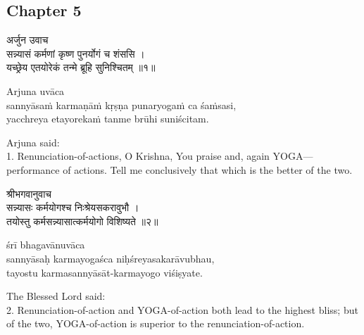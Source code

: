 \chapterdrop

\begin{center}

\headerspace
{}

\section{Chapter 5}

\headerspace
{}

\headerspace
{}

\headerspace
{}

\headerspace
\end{center}

\begin{gitaverse}
अर्जुन उवाच \\
सन्न्यासं कर्मणां कृष्ण पुनर्योगं च शंससि । \\
यच्छ्रेय एतयोरेकं तन्मे ब्रूहि सुनिश्चितम् ॥१॥
\end{gitaverse}

\begin{transliteration}
Arjuna uvāca \\
sannyāsaṁ karmaṇāṁ kṛṣṇa punaryogaṁ ca śaṁsasi, \\
yacchreya etayorekaṁ tanme brūhi suniścitam.
\end{transliteration}

Arjuna said: \\
1. Renunciation-of-actions, O Krishna, You praise and, again YOGA---performance
of actions. Tell me conclusively that which is the better of the two.

\begin{gitaverse}
श्रीभगवानुवाच \\
सन्न्यासः कर्मयोगश्च निःश्रेयसकरावुभौ । \\
तयोस्तु कर्मसन्न्यासात्कर्मयोगो विशिष्यते ॥२॥
\end{gitaverse}

\begin{transliteration}
śrī bhagavānuvāca \\
sannyāsaḥ karmayogaśca niḥśreyasakarāvubhau, \\
tayostu karmasannyāsāt-karmayogo viśiṣyate.
\end{transliteration}

The Blessed Lord said: \\
2. Renunciation-of-action and YOGA-of-action both lead to the highest bliss;
but of the two, YOGA-of-action is superior to the renunciation-of-action.


